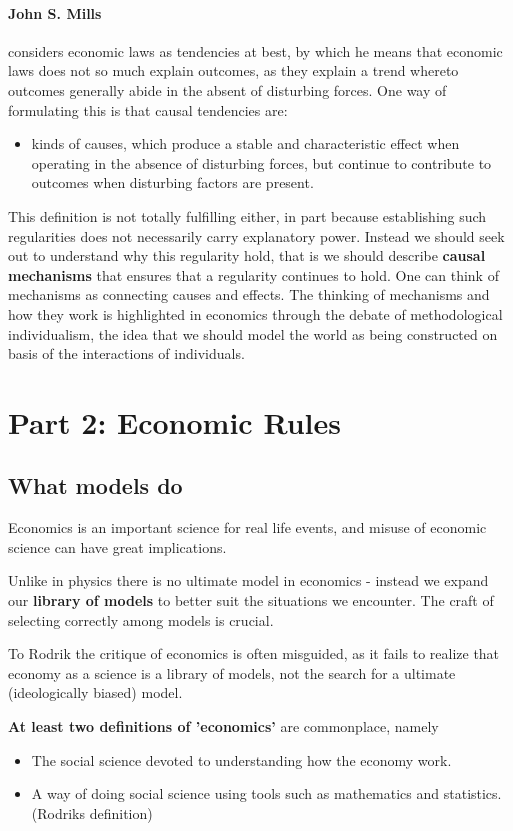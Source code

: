 \documentclass[12pt, a4paper]{article}
\begin{document}
\begin{multicols}{2}
\paragraph{John S. Mills} considers economic laws as tendencies at best, by which he means that economic laws does not so much explain outcomes, as they explain a trend whereto outcomes generally abide in the absent of disturbing forces. One way of formulating this is that causal tendencies are:
\begin{itemize}
\item[] kinds of causes, which produce a stable and characteristic effect when operating in the absence of disturbing forces, but continue to contribute to outcomes when disturbing factors are present.  
\end{itemize}
This definition is not totally fulfilling either, in part because establishing such regularities does not necessarily carry explanatory power. Instead we should seek out to understand why this regularity hold, that is we should describe \textbf{causal mechanisms} that ensures that a regularity continues to hold. One can think of mechanisms as connecting causes and effects. The thinking of mechanisms and how they work is highlighted in economics through the debate of methodological individualism, the idea that we should model the world as being constructed on basis of the interactions of individuals.   
\section{Part 2: Economic Rules}

\subsection{What models do}
Economics is an important science for real life events, and misuse of economic science can have great implications. 

Unlike in physics there is no ultimate model in economics - instead we expand our \textbf{library of models} to better suit the situations we encounter. The craft of selecting correctly among models is crucial.

To Rodrik the critique of economics is often misguided, as it fails to realize that economy as a science is a library of models, not the search for a ultimate (ideologically biased) model.

\textbf{At least two definitions of 'economics'} are commonplace, namely 
\begin{itemize}
\item The social science devoted to understanding how the economy work.
\item A way of doing social science using tools such as mathematics and statistics. (Rodriks definition)
\end{itemize}


\end{multicols}
\end{document}
